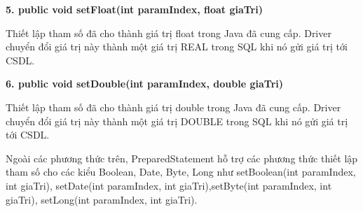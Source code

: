 \textbf{ 5. public void setFloat(int paramIndex, float giaTri)}
 
 Thiết lập tham số đã cho thành giá trị float trong Java đã cung cấp. Driver chuyển đổi giá trị này thành một giá trị REAL trong SQL khi nó gửi giá trị tới CSDL. 
 
\textbf{ 6. public void setDouble(int paramIndex, double giaTri)}
 
 Thiết lập tham số đã cho thành giá trị double trong Java đã cung cấp. Driver chuyển đổi giá trị này thành một giá trị DOUBLE trong SQL khi nó gửi giá trị tới CSDL.
 
Ngoài các phương thức trên, PreparedStatement hỗ trợ các phương thức thiết lập tham số cho các kiểu Boolean, Date, Byte, Long như setBoolean(int paramIndex, int giaTri), setDate(int paramIndex, int giaTri),setByte(int paramIndex, int giaTri), setLong(int paramIndex, int giaTri).


